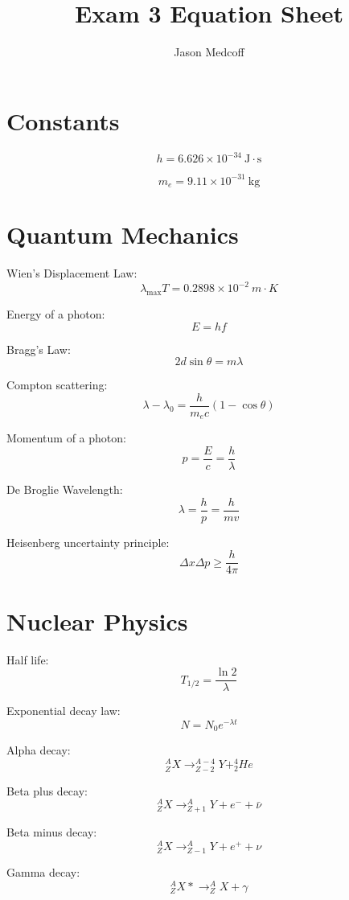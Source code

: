 \documentclass{article}
\title{Exam 3 Equation Sheet}
\author{Jason Medcoff}
\date{}
\begin{document}
	\maketitle
	
	\section{Constants}
	
	$$ h = 6.626 \times 10^{-34}\ \text{J} \cdot \text{s} $$
	
	$$ m_e = 9.11 \times 10^{-31}\ \text{kg} $$
	
	\section{Quantum Mechanics}
	
	Wien's Displacement Law:
	$$ \lambda_{\text{max}} T = 0.2898 \times 10^{-2}\ m \cdot K $$
	
	Energy of a photon:
	$$ E = hf $$
	
	Bragg's Law:
	$$ 2d\sin\theta = m\lambda $$
	
	Compton scattering:
	$$ \lambda - \lambda_0 = \frac{h}{m_e c} (1 - \cos\theta) $$
	
	Momentum of a photon:
	$$ p = \frac{E}{c} = \frac{h}{\lambda} $$
	
	De Broglie Wavelength:
	$$ \lambda = \frac{h}{p} = \frac{h}{mv} $$
	
	Heisenberg uncertainty principle:
	$$ \Delta x \Delta p \geq \frac{h}{4\pi} $$
	
	\section{Nuclear Physics}
	
	Half life:
	$$ T_{1/2} = \frac{\ln 2}{\lambda} $$
	
	Exponential decay law:
	$$ N = N_0 e^{-\lambda t} $$
	
	Alpha decay:
	$$ ^A _Z X \rightarrow ^{A-4}_{Z-2} Y + ^4 _2 He $$
	
	Beta plus decay:
	$$ ^A _Z X \rightarrow ^{A}_{Z+1} Y + e^- + \bar{\nu} $$
	
	Beta minus decay:
	$$ ^A _Z X \rightarrow ^{A}_{Z-1} Y + e^+ + \nu $$
	
	Gamma decay:
	$$ ^A _Z X* \rightarrow ^A _Z X + \gamma $$
	
\end{document}
